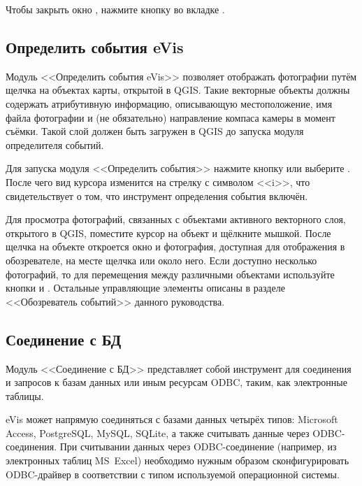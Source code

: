 Чтобы закрыть окно , нажмите кнопку 
во вкладке .

\subsection{Определить события eVis}\label{evis_id_tool}

Модуль <<Определить события eVis>> позволяет отображать фотографии путём
щелчка на объектах карты, открытой в QGIS. Такие векторные объекты должны
содержать атрибутивную информацию, описывающую местоположение, имя файла
фотографии и (не обязательно) направление компаса камеры в момент съёмки.
Такой слой должен быть загружен в QGIS до запуска модуля определителя
событий.

\label{evis_launch_id}

Для запуска модуля <<Определить события>> нажмите кнопку
 или выберите
 \arrow {} \arrow
{}. После чего вид курсора изменится
на стрелку с символом <<i>>, что свидетельствует о том, что инструмент
определения события включён.

Для просмотра фотографий, связанных с объектами активного векторного слоя,
открытого в QGIS, поместите курсор на объект и щёлкните мышкой.
После щелчка на объекте откроется окно  и
фотография, доступная для отображения в обозревателе, на месте щелчка
или около него. Если доступно несколько фотографий, то для перемещения между
различными объектами используйте кнопки  и
. Остальные управляющие элементы описаны в разделе
<<Обозреватель событий>> данного руководства.

\subsection{Соединение с БД}\label{evis_database}

Модуль <<Соединение с БД>> представляет собой инструмент для соединения и
запросов к базам данных или иным ресурсам ODBC, таким, как электронные
таблицы.

eVis может напрямую соединяться с базами данных четырёх типов: Microsoft Access,
PostgreSQL, MySQL, SQLite, а также считывать данные через ODBC-соединения. При
считывании данных через ODBC-соединение (например, из электронных таблиц MS~Excel)
необходимо нужным образом сконфигурировать ODBC-драйвер в соответствии с типом
используемой операционной системы.

